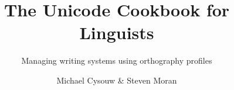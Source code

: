 

\title{The Unicode Cookbook for Linguists}
\subtitle{Managing writing systems using orthography profiles}
\dedication{Change dedication in localmetadata.tex}
\author{Michael Cysouw \& Steven Moran}
\renewcommand{\lsISBN}{978--3--000000--00--0}                     
\renewcommand{\lsSeries}{dummyseries} 
\renewcommand{\lsSeriesNumber}{99} 
\renewcommand{\lsURL}{http://langsci-press.org/catalog/book/0} 
